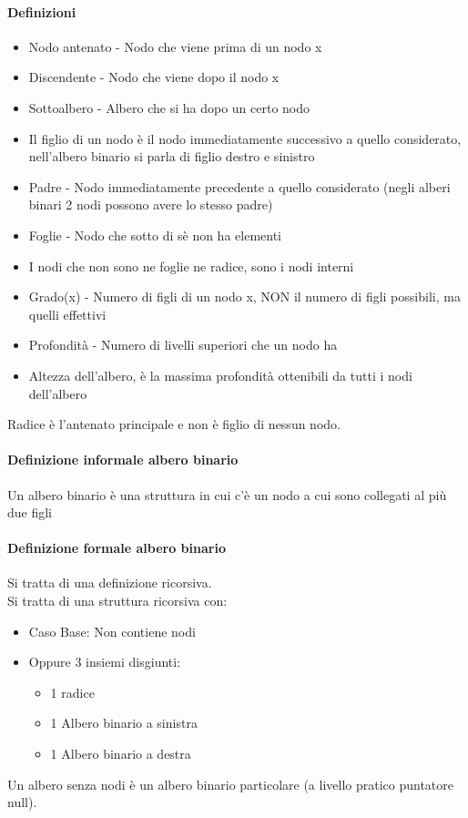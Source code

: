 \paragraph*{Definizioni}
\begin{itemize}
    \item Nodo antenato - Nodo che viene prima di un nodo x
    \item Discendente - Nodo che viene dopo il nodo x 
    \item Sottoalbero - Albero che si ha dopo un certo nodo
    \item Il figlio di un nodo è il nodo immediatamente successivo a quello considerato, nell'albero
    binario si parla di figlio destro e sinistro
    \item Padre - Nodo immediatamente precedente a quello considerato (negli alberi binari 2 nodi possono
    avere lo stesso padre)
    \item Foglie - Nodo che sotto di sè non ha elementi
    \item I nodi che non sono ne foglie ne radice, sono i nodi interni
    \item Grado(x) - Numero di figli di un nodo x, NON il numero di figli possibili, ma quelli effettivi
    \item Profondità - Numero di livelli superiori che un nodo ha
    \item Altezza dell'albero, è la massima profondità ottenibili da tutti i nodi dell'albero
\end{itemize}
Radice è l'antenato principale e non è figlio di nessun nodo.
\paragraph*{Definizione informale albero binario} Un albero binario è una struttura in cui c'è un nodo a cui
sono collegati al più due figli
\paragraph*{Definizione formale albero binario} Si tratta di una definizione ricorsiva.\\
Si tratta di una struttura ricorsiva con:
\begin{itemize}
    \item Caso Base: Non contiene nodi
    \item Oppure 3 insiemi disgiunti:
    \begin{itemize}
        \item 1 radice
        \item 1 Albero binario a sinistra
        \item 1 Albero binario a destra
    \end{itemize}
\end{itemize}
Un albero senza nodi è un albero binario particolare (a livello pratico puntatore null).

